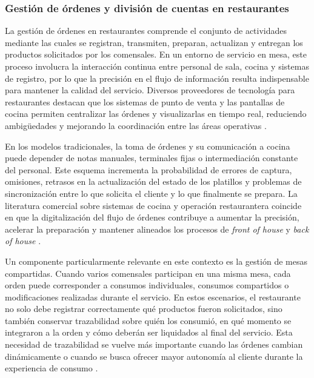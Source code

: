 \documentclass[12pt]{report}
\begin{document}
\subsubsection{Gestión de órdenes y división de cuentas en restaurantes}

La gestión de órdenes en restaurantes comprende el conjunto de actividades mediante las cuales se registran, transmiten, preparan, actualizan y entregan los productos solicitados por los comensales. En un entorno de servicio en mesa, este proceso involucra la interacción continua entre personal de sala, cocina y sistemas de registro, por lo que la precisión en el flujo de información resulta indispensable para mantener la calidad del servicio. Diversos proveedores de tecnología para restaurantes destacan que los sistemas de punto de venta y las pantallas de cocina permiten centralizar las órdenes y visualizarlas en tiempo real, reduciendo ambigüedades y mejorando la coordinación entre las áreas operativas \cite{square_restaurant_pos_2025,toast_kds_2026,square_kds_2025}.

En los modelos tradicionales, la toma de órdenes y su comunicación a cocina puede depender de notas manuales, terminales fijas o intermediación constante del personal. Este esquema incrementa la probabilidad de errores de captura, omisiones, retrasos en la actualización del estado de los platillos y problemas de sincronización entre lo que solicita el cliente y lo que finalmente se prepara. La literatura comercial sobre sistemas de cocina y operación restaurantera coincide en que la digitalización del flujo de órdenes contribuye a aumentar la precisión, acelerar la preparación y mantener alineados los procesos de \textit{front of house} y \textit{back of house} \cite{square_kds_2025,toast_cash_register_2025,square_kds_product}.

Un componente particularmente relevante en este contexto es la gestión de mesas compartidas. Cuando varios comensales participan en una misma mesa, cada orden puede corresponder a consumos individuales, consumos compartidos o modificaciones realizadas durante el servicio. En estos escenarios, el restaurante no solo debe registrar correctamente qué productos fueron solicitados, sino también conservar trazabilidad sobre quién los consumió, en qué momento se integraron a la orden y cómo deberán ser liquidados al final del servicio. Esta necesidad de trazabilidad se vuelve más importante cuando las órdenes cambian dinámicamente o cuando se busca ofrecer mayor autonomía al cliente durante la experiencia de consumo \cite{lightspeed_tableside_2024,nra_mobile_order_systems_2025}.
\end{document}
